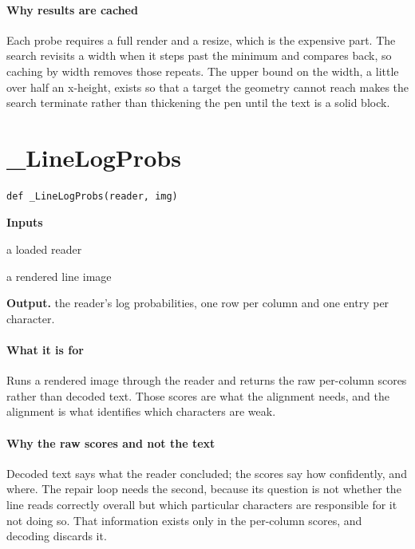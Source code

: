 \paragraph{Why results are cached}
Each probe requires a full render and a resize, which is the expensive part. The search revisits a width when it steps past the minimum and compares back, so caching by width removes those repeats. The upper bound on the width, a little over half an x-height, exists so that a target the geometry cannot reach makes the search terminate rather than thickening the pen until the text is a solid block.


\section{\_LineLogProbs}
\begin{lstlisting}[style=sig]
def _LineLogProbs(reader, img)
\end{lstlisting}

\noindent\textbf{Inputs}
\begin{description}[leftmargin=2.2em,style=nextline,font=\normalfont\ttfamily]\setlength\itemsep{1pt}
  \item[{reader}] \normalfont a loaded reader
  \item[{img}] \normalfont a rendered line image
\end{description}

\noindent\textbf{Output.} the reader's log probabilities, one row per column and one entry per character.


\paragraph{What it is for}
Runs a rendered image through the reader and returns the raw per-column scores rather than decoded text. Those scores are what the alignment needs, and the alignment is what identifies which characters are weak.


\paragraph{Why the raw scores and not the text}
Decoded text says what the reader concluded; the scores say how confidently, and where. The repair loop needs the second, because its question is not whether the line reads correctly overall but which particular characters are responsible for it not doing so. That information exists only in the per-column scores, and decoding discards it.


